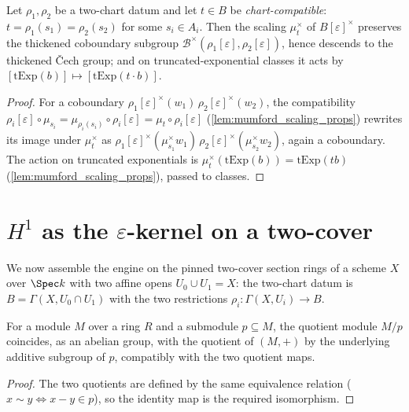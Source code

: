 \begin{lemma}
  \label{lem:cech_scaling_equivariance}
  \leanok
  Let \(\rho_1, \rho_2\) be a two-chart datum and let \(t \in B\) be
  \emph{chart-compatible}: \(t = \rho_1(s_1) = \rho_2(s_2)\) for some \(s_i \in A_i\).
  Then the scaling \(\mu_t^\times\) of \(B[\varepsilon]^\times\) preserves the
  thickened coboundary subgroup \(\mathcal B^\times(\rho_1[\varepsilon],
  \rho_2[\varepsilon])\), hence descends to the thickened \v{C}ech group; and on
  truncated-exponential classes it acts by
  \([\mathrm{tExp}(b)] \mapsto [\mathrm{tExp}(t \cdot b)]\).
\end{lemma}
\begin{proof}
  \leanok
  For a coboundary \(\rho_1[\varepsilon]^\times(w_1)\,\rho_2[\varepsilon]^\times(w_2)\),
  the compatibility \(\rho_i[\varepsilon] \circ \mu_{s_i} = \mu_{\rho_i(s_i)} \circ
  \rho_i[\varepsilon] = \mu_t \circ \rho_i[\varepsilon]\)
  (\ref{lem:mumford_scaling_props}) rewrites its image under \(\mu_t^\times\) as
  \(\rho_1[\varepsilon]^\times(\mu_{s_1}^\times w_1)\,
  \rho_2[\varepsilon]^\times(\mu_{s_2}^\times w_2)\), again a coboundary. The action on
  truncated exponentials is \(\mu_t^\times(\mathrm{tExp}(b)) = \mathrm{tExp}(t b)\)
  (\ref{lem:mumford_scaling_props}), passed to classes.
\end{proof}

\section{\texorpdfstring{\(H^1\)}{H1} as the
  \texorpdfstring{\(\varepsilon\)}{epsilon}-kernel on a two-cover}

We now assemble the engine on the pinned two-cover section rings of a scheme \(X\) over
\(\Spec k\) with two affine opens \(U_0 \cup U_1 = X\): the two-chart datum
is \(B = \Gamma(X, U_0 \cap U_1)\) with the two restrictions
\(\rho_i : \Gamma(X, U_i) \to B\).

\begin{lemma}
  \label{lem:submodule_quotient_addEquiv}
  \leanok
  For a module \(M\) over a ring \(R\) and a submodule \(p \subseteq M\), the quotient
  module \(M/p\) coincides, as an abelian group, with the quotient of \((M, +)\) by the
  underlying additive subgroup of \(p\), compatibly with the two quotient maps.
\end{lemma}
\begin{proof}
  \leanok
  The two quotients are defined by the same equivalence relation
  (\(x \sim y \iff x - y \in p\)), so the identity map is the required isomorphism.
\end{proof}


